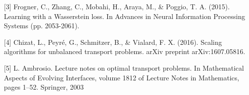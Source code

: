 \documentclass{article}
\begin{document}
[3] Frogner, C., Zhang, C., Mobahi, H., Araya, M., \& Poggio, T. A. (2015). Learning with a Wasserstein loss. In Advances in Neural Information Processing Systems (pp. 2053-2061).

[4] Chizat, L., Peyré, G., Schmitzer, B., \& Vialard, F. X. (2016). Scaling algorithms for unbalanced transport problems. arXiv preprint arXiv:1607.05816.
 
 [5] L. Ambrosio. Lecture notes on optimal transport problems. In Mathematical Aspects of Evolving Interfaces, volume 1812 of Lecture Notes in Mathematics, pages 1–52. Springer, 2003
\end{document}
